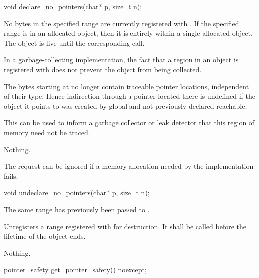 %
\begin{itemdecl}
void declare_no_pointers(char* p, size_t n);
\end{itemdecl}

\begin{itemdescr}
\pnum
\expects
No bytes in the specified range are currently registered with
. If the specified range is in an allocated object,
then it is entirely within a single allocated object. The object is
live until the corresponding  call.
\begin{note}
In a garbage-collecting implementation, the fact that a region in an object is
registered with  does not prevent the object from
being collected.
\end{note}

\pnum
\effects
The  bytes starting at  no longer contain
traceable pointer locations, independent of their type. Hence
indirection through a pointer located there is undefined if the object
it points to was created by global  and not
previously declared reachable.
\begin{note}
This can be used to inform a
garbage collector or leak detector that this region of memory need not
be traced.
\end{note}

\pnum
\throws
Nothing.

\pnum
\begin{note}
The request can be ignored
if a memory allocation needed by the implementation fails.
\end{note}
\end{itemdescr}

%
\begin{itemdecl}
void undeclare_no_pointers(char* p, size_t n);
\end{itemdecl}

\begin{itemdescr}
\pnum
\expects
The same range has previously been passed to .

\pnum
\effects
Unregisters a range registered with  for
destruction. It shall be called before the lifetime of the object ends.

\pnum
\throws
Nothing.
\end{itemdescr}

%
\begin{itemdecl}
pointer_safety get_pointer_safety() noexcept;
\end{itemdecl}

